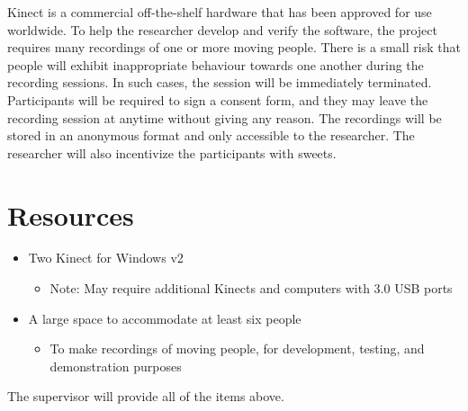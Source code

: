 \documentclass[paper=a4, fontsize=11pt]{scrartcl}
\numberwithin{equation}{section}
\numberwithin{figure}{section}
\numberwithin{table}{section}
\begin{document}
Kinect is a commercial off-the-shelf hardware that has been approved for use worldwide. To help the researcher develop and verify the software, the project requires many recordings of one or more moving people. There is a small risk that people will exhibit inappropriate behaviour towards one another during the recording sessions. In such cases, the session will be immediately terminated. Participants will be required to sign a consent form, and they may leave the recording session at anytime without giving any reason. The recordings will be stored in an anonymous format and only accessible to the researcher. The researcher will also incentivize the participants with sweets.

\section{Resources}

\begin{itemize}
	\item Two Kinect for Windows v2
		\begin{itemize}
			\item Note: May require additional Kinects and computers with 3.0 USB ports
		\end{itemize}
	\item A large space to accommodate at least six people
		\begin{itemize}
			\item To make recordings of moving people, for development, testing, and demonstration purposes
		\end{itemize}
\end{itemize}

The supervisor will provide all of the items above.



\end{document}
